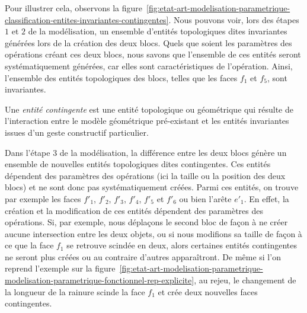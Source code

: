 Pour illustrer cela, observons la
figure~\ref{fig:etat-art-modelisation-parametrique-classification-entites-invariantes-contingentes}. Nous pouvons voir, lors des étapes $1$ et $2$ de la modélisation, un ensemble
d'entités topologiques dites invariantes générées lors de la création des deux blocs. %
Quels que soient les paramètres des opérations créant ces deux blocs, nous
savons que l'ensemble de ces entités seront systématiquement générées, car elles
sont caractéristiques de l'opération. %
Ainsi, l'ensemble des entités topologiques des blocs, telles que les faces
$f_{1}$ et $f_{5}$, sont invariantes. %

\begin{definition}\label{def:entite-contingente}%
	Une \emph{entité contingente} est une entité topologique ou géométrique qui résulte
	de l'interaction entre le modèle géométrique pré-existant et les entités
	invariantes issues d'un geste constructif particulier. %
\end{definition}

Dans l'étape $3$ de la modélisation, la différence entre les deux blocs génère
un ensemble de nouvelles entités topologiques dites contingentes. %
Ces entités dépendent des paramètres des opérations (ici la taille ou la
position des deux blocs) et ne sont donc pas systématiquement créées. %
Parmi ces entités, on trouve par exemple les faces $f'_{1}$, $f'_{2}$, $f'_{3}$,
$f'_{4}$, $f'_{5}$ et $f'_{6}$
ou bien l'arête $e'_{1}$. %
En effet, la création et la modification de ces entités dépendent des paramètres
des opérations. %
Si, par exemple, nous déplaçons le second bloc de façon à ne créer aucune
intersection entre les deux objets, ou si nous modifions sa taille de façon à ce
que la face $f_{1}$ se retrouve scindée en deux, alors certaines entités
contingentes ne seront plus créées ou au contraire d'autres apparaîtront. %
De même si l'on reprend l'exemple sur la
figure~\ref{fig:etat-art-modelisation-parametrique-modelisation-parametrique-fonctionnel-rep-explicite},
au rejeu, le changement de la longueur de la rainure scinde la face $f_{1}$ et
crée deux nouvelles faces contingentes. %


